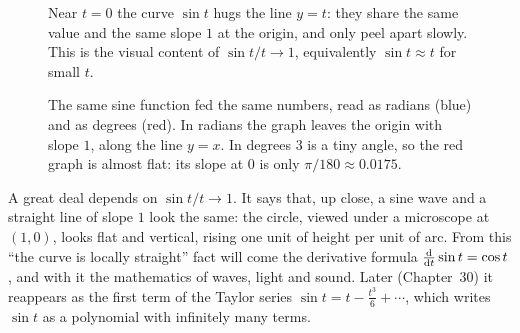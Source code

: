 \begin{figure}[htbp]
\centering
{}
\caption{Near $t=0$ the curve $\sin t$ hugs the line $y=t$: they share the same value and the same slope $1$ at the origin, and only peel apart slowly. This is the visual content of $\sin t/t\to 1$, equivalently $\sin t\approx t$ for small $t$.}
\label{ch04:fig-sint-approx-t}
\end{figure}

\begin{figure}[htbp]
\centering
{}
\caption{The same sine function fed the same numbers, read as radians (blue) and as degrees (red). In radians the graph leaves the origin with slope $1$, along the line $y=x$. In degrees $3$ is a tiny angle, so the red graph is almost flat: its slope at $0$ is only $\pi/180 \approx 0.0175$.}
\label{ch04:fig-degrees-slope}
\end{figure}

\begin{aestheticbox}
A great deal depends on $\sin t/t\to 1$. It says that, up close, a sine wave and a straight line of slope $1$ look the same: the circle, viewed under a microscope at $(1,0)$, looks flat and vertical, rising one unit of height per unit of arc. From this ``the curve is locally straight'' fact will come the derivative formula $\frac{\mathrm{d} }{\mathrm{d} t}\sin t = \cos t$, and with it the mathematics of waves, light and sound. Later (Chapter~30) it reappears as the first term of the Taylor series $\sin t = t - \tfrac{t^3}{6} + \cdots$, which writes $\sin t$ as a polynomial with infinitely many terms.
\end{aestheticbox}

